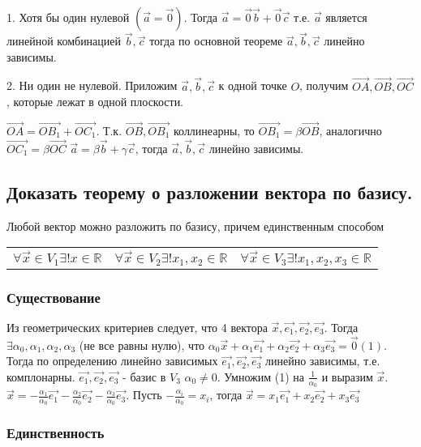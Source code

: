 \documentclass[a4paper, 10pt]{article}
\newcommand{\bvec}[1]{\overrightarrow{#1}}
\renewcommand{\a}{\vec{a}}
\renewcommand{\b}{\vec{b}}
\renewcommand{\c}{\vec{c}}
\newcommand{\nul}{\vec{0}}
\newcommand{\image}[2]{
	\begin{figure}[H]
		\center{\texttt{[image: img/\#1]} }
    \end{figure}
}
\begin{document}
1. Хотя бы один нулевой $(\a = \nul)$. Тогда $\a = \nul\b + \nul\c$
т.е. $\a$ является линейной комбинацией $\b, \c$ тогда по основной теореме
$\a, \b, \c$ линейно зависимы. 

2. Ни один не нулевой. Приложим $\a, \b, \c$ к одной точке $O$, 
получим $\bvec{OA}, \bvec{OB}, \bvec{OC}$, которые лежат в одной плоскости.
\image{3.png}{200}
$\bvec{OA} = \bvec{OB_1} + \bvec{OC_1}$. Т.к. $\bvec{OB}, \bvec{OB_1}$ коллинеарны, то
$\bvec{OB_1} = \beta\bvec{OB}$, аналогично $\bvec{OC_1} = \beta\bvec{OC}$ 
$\a = \beta\b + \gamma\c$, тогда $\a, \b, \c$ линейно зависимы.

\subsection{Доказать теорему о разложении вектора по базису.}

\begin{center}
Любой вектор можно разложить по базису, причем единственным способом
\begin{tabular}{c c c} 
    $\forall \vec{x} \in V_1 \exists ! x \in \mathbb{R}$&
    $\forall \vec{x} \in V_2 \exists ! x_1, x_2 \in \mathbb{R}$&
    $\forall \vec{x} \in V_3 \exists ! x_1, x_2, x_3 \in \mathbb{R}$\\
\end{tabular}
\end{center}

\subsubsection{Существование}

Из геометрических критериев следует, что 4 вектора $\vec{x}, \vec{e_1}, \vec{e_2}, \vec{e_3}$.
Тогда $\exists \alpha_0, \alpha_1, \alpha_2, \alpha_3$ (не все равны нулю), что
$\alpha_0\vec{x} + \alpha_1\vec{e_1} + \alpha_2\vec{e_2} + \alpha_3\vec{e_3} = \nul (1)$.
Тогда по определению линейно зависимых $\vec{e_1}, \vec{e_2}, \vec{e_3}$ линейно зависимы,
т.е. комплонарны. $\vec{e_1}, \vec{e_2}, \vec{e_3}$ - базис в $V_3$ $\alpha_0 \ne 0$.
Умножим (1) на $\frac{1}{\alpha_0}$ и выразим $\vec{x}$. 
$\vec{x} = -\frac{\alpha_1}{\alpha_0}\vec{e_1}-\frac{\alpha_2}{\alpha_0}\vec{e_2}
-\frac{\alpha_3}{\alpha_0}\vec{e_3}$. Пусть $-\frac{\alpha_i}{\alpha_0} = x_i$, тогда
$\vec{x} = x_1\vec{e_1} + x_2\vec{e_2} + x_3\vec{e_3}$

\subsubsection{Единственность}
\end{document}
